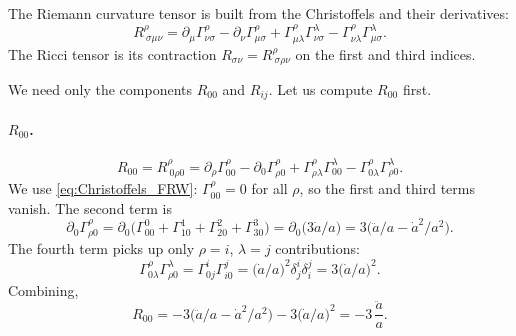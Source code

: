 The Riemann curvature tensor is built from the Christoffels and their derivatives:
\begin{equation}
  R^\rho_{\ \sigma\mu\nu} = \partial_\mu \Gamma^\rho_{\nu\sigma} - \partial_\nu \Gamma^\rho_{\mu\sigma} + \Gamma^\rho_{\mu\lambda}\Gamma^\lambda_{\nu\sigma} - \Gamma^\rho_{\nu\lambda}\Gamma^\lambda_{\mu\sigma}.
  \label{eq:Riemann_def}
\end{equation}
The Ricci tensor is its contraction $R_{\sigma\nu} = R^\rho_{\ \sigma\rho\nu}$ on the first and third indices.

We need only the components $R_{00}$ and $R_{ij}$. Let us compute $R_{00}$ first.

\paragraph{$R_{00}$.}
\[
  R_{00} = R^\rho_{\ 0\rho 0} = \partial_\rho \Gamma^\rho_{00} - \partial_0 \Gamma^\rho_{\rho 0} + \Gamma^\rho_{\rho \lambda}\Gamma^\lambda_{00} - \Gamma^\rho_{0\lambda}\Gamma^\lambda_{\rho 0}.
\]
We use \cref{eq:Christoffels_FRW}: $\Gamma^\rho_{00} = 0$ for all $\rho$, so the first and third terms vanish. The second term is
\[
  \partial_0 \Gamma^\rho_{\rho 0} = \partial_0 \bigl(\Gamma^0_{00} + \Gamma^1_{10} + \Gamma^2_{20} + \Gamma^3_{30}\bigr) = \partial_0 \bigl(3 \dot{a}/a\bigr) = 3\bigl(\ddot a/a - \dot{a}^2/a^2\bigr).
\]
The fourth term picks up only $\rho = i$, $\lambda = j$ contributions:
\[
  \Gamma^\rho_{0\lambda}\Gamma^\lambda_{\rho 0} = \Gamma^i_{0j}\Gamma^j_{i0} = \bigl(\dot{a}/a\bigr)^2 \delta^i_j \delta^j_i = 3\bigl(\dot{a}/a\bigr)^2.
\]
Combining,
\begin{equation}
  R_{00} = -3\bigl(\ddot a/a - \dot{a}^2/a^2\bigr) - 3\bigl(\dot{a}/a\bigr)^2 = -3\,\frac{\ddot a}{a}.
  \label{eq:R00}
\end{equation}

